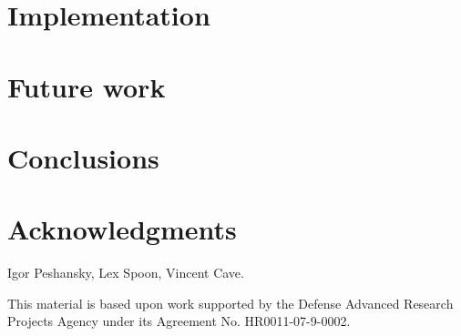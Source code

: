 \documentclass[nocopyrightspace,preprint,9pt]{sigplanconf}
\begin{document}
\section{Implementation}
\label{sec:implementation}


\section{Future work}
\label{sec:future}


\section{Conclusions}
\label{sec:conclusions}


\section*{Acknowledgments}

Igor Peshansky,
Lex Spoon,
Vincent Cave.

This material is based upon work supported by the Defense
Advanced Research Projects Agency under its Agreement No.
HR0011-07-9-0002.




\balance

% 
\end{document}
